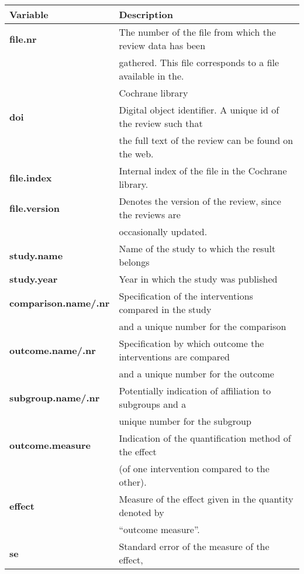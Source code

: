 \begin{table}[ht]
  \begin{center}
    \begin{tabular}{l l}
      \textbf{Variable} & \textbf{Description}\\
      \hline
      \textbf{file.nr} & The number of the file from which the review data has been \\&gathered. This file corresponds to a file available in the. \\& Cochrane library\\
      \textbf{doi} & Digital object identifier. A unique id of the review such that  \\ &the full text of the review can be found on the web.\\
      \textbf{file.index} & Internal index of the file in the Cochrane library.\\
      \textbf{file.version} & Denotes the version of the review, since the reviews are \\ &occasionally updated.\\
      \hline
      \textbf{study.name} & Name of the study to which the result belongs\\
      \textbf{study.year} & Year in which the study was published\\
      \hline
      \textbf{comparison.name/.nr} & Specification of the interventions compared in the study  \\ &and a unique number for the comparison\\
      \textbf{outcome.name/.nr} & Specification by which outcome the interventions are compared\\ &and a unique number for the outcome\\
      \textbf{subgroup.name/.nr} & Potentially indication of affiliation to subgroups and a \\ &unique number for the subgroup\\
      \textbf{outcome.measure} & Indication of the quantification method of the effect \\ &(of one intervention compared to the other).\\
      \textbf{effect} & Measure of the effect given in the quantity denoted by \\ &``outcome measure''.\\
      \textbf{se} & Standard error of the measure of the effect,\\

\end{tabular}
\end{center}
\end{table}

